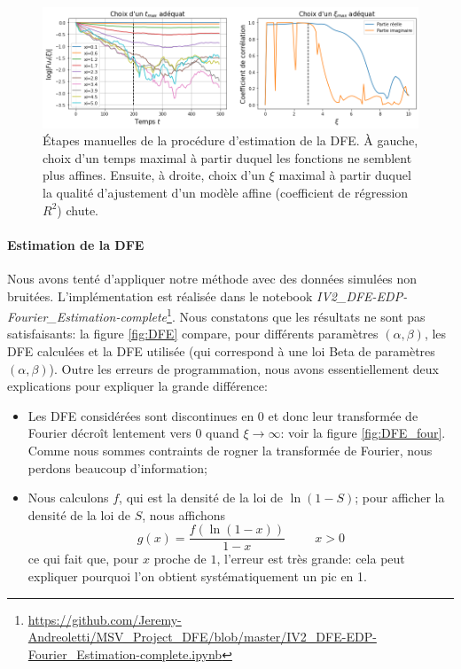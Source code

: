 \documentclass[12pt]{article}
\newcommand{\esp}{\hspace{1cm}}
\begin{document}
\begin{figure}[h]
  \begin{center}
    \includegraphics[width=0.95\linewidth]{../Img/DFE_choix_tmax_xi.png}
  \end{center}
  \caption{\label{fig:DFE_choix}Étapes manuelles de la procédure d'estimation de la DFE. À gauche, choix d'un temps maximal à partir duquel les fonctions ne semblent plus affines. Ensuite, à droite, choix d'un $\xi$ maximal à partir duquel la qualité d'ajustement d'un modèle affine (coefficient de régression $R^2$) chute.}
\end{figure}

\FloatBarrier
\paragraph{Estimation de la DFE}

Nous avons tenté d'appliquer notre méthode avec des données simulées non bruitées. L'implémentation est réalisée dans le notebook \emph{IV2\_DFE-EDP-Fourier\_Estimation-complete}\footnote{\url{https://github.com/Jeremy-Andreoletti/MSV_Project_DFE/blob/master/IV2_DFE-EDP-Fourier_Estimation-complete.ipynb}}. Nous constatons que les résultats ne sont pas satisfaisants: la figure \ref{fig:DFE} compare, pour différents paramètres $(\alpha,\beta)$, les DFE calculées et la DFE utilisée (qui correspond à une loi Beta de paramètres $(\alpha,\beta)$). Outre les erreurs de programmation, nous avons essentiellement deux explications pour expliquer la grande différence:
\begin{itemize}
	\item Les DFE considérées sont discontinues en 0 et donc leur transformée de Fourier décroît lentement vers 0 quand $\xi\to\infty$: voir la figure \ref{fig:DFE_four}. Comme nous sommes contraints de rogner la transformée de Fourier, nous perdons beaucoup d'information;
	\item Nous calculons $f$, qui est la densité de la loi de $\ln(1-S)$; pour afficher la densité de la loi de $S$, nous affichons \[g(x)=\frac{f(\ln (1-x))}{1-x}\esp x>0\] ce qui fait que, pour $x$ proche de $1$, l'erreur est très grande: cela peut expliquer pourquoi l'on obtient systématiquement un pic en 1.
\end{itemize}
\end{document}
